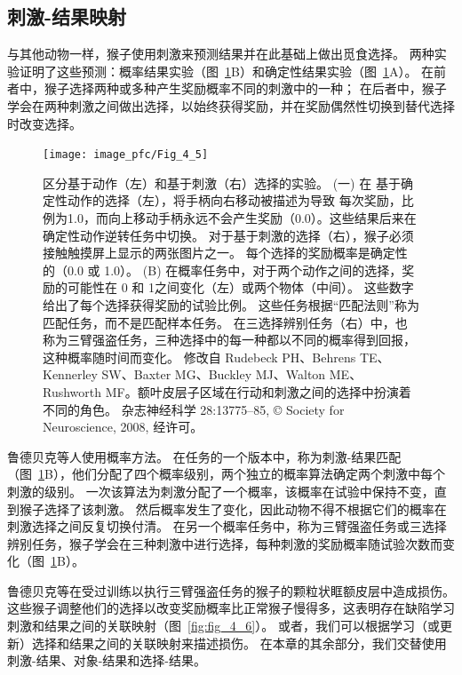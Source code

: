 \subsection{刺激-结果映射}

与其他动物一样，猴子使用刺激来预测结果并在此基础上做出觅食选择。
两种实验证明了这些预测：概率结果实验（图~\ref{fig:fig_4_5}B）和确定性结果实验（图~\ref{fig:fig_4_5}A）。
在前者中，猴子选择两种或多种产生奖励概率不同的刺激中的一种；
在后者中，猴子学会在两种刺激之间做出选择，以始终获得奖励，并在奖励偶然性切换到替代选择时改变选择。\par


\begin{figure}[!htb]
	\centering
	\texttt{[image: image\_pfc/Fig\_4\_5]}
	\caption{区分基于动作（左）和基于刺激（右）选择的实验。 (一) 在
		基于确定性动作的选择（左），将手柄向右移动被描述为导致
		每次奖励，比例为1.0，而向上移动手柄永远不会产生奖励（0.0）。这些结果后来在确定性动作逆转任务中切换。
		对于基于刺激的选择（右），猴子必须接触触摸屏上显示的两张图片之一。
		每个选择的奖励概率是确定性的（0.0 或 1.0）。 
		(B) 在概率任务中，对于两个动作之间的选择，奖励的可能性在 0 和 1之间变化（左）或两个物体（中间）。
		这些数字给出了每个选择获得奖励的试验比例。
		这些任务根据“匹配法则”称为匹配任务，而不是匹配样本任务。
		在三选择辨别任务（右）中，也称为三臂强盗任务，三种选择中的每一种都以不同的概率得到回报，这种概率随时间而变化。
		修改自	Rudebeck PH、Behrens TE、Kennerley SW、Baxter MG、Buckley MJ、Walton ME、Rushworth MF。额叶皮层子区域在行动和刺激之间的选择中扮演着不同的角色。
		杂志神经科学 28:13775–85, © Society for Neuroscience, 2008, 经许可。}
	\label{fig:fig_4_5}
\end{figure}


鲁德贝克等人\cite{rudebeck2008frontal}使用概率方法。
在任务的一个版本中，称为刺激-结果匹配（图~\ref{fig:fig_4_5}B），他们分配了四个概率级别，两个独立的概率算法确定两个刺激中每个刺激的级别。
一次该算法为刺激分配了一个概率，该概率在试验中保持不变，直到猴子选择了该刺激。
然后概率发生了变化，因此动物不得不根据它们的概率在刺激选择之间反复切换付清。
在另一个概率任务中，称为三臂强盗任务或三选择辨别任务，猴子学会在三种刺激中进行选择，每种刺激的奖励概率随试验次数而变化（图~\ref{fig:fig_4_5}B）。\par


鲁德贝克等在受过训练以执行三臂强盗任务的猴子的颗粒状眶额皮层中造成损伤。
这些猴子调整他们的选择以改变奖励概率比正常猴子慢得多，这表明存在缺陷学习刺激和结果之间的关联映射（图~\ref{fig:fig_4_6}）。
或者，我们可以根据学习（或更新）选择和结果之间的关联映射来描述损伤。
在本章的其余部分，我们交替使用刺激-结果、对象-结果和选择-结果。\par


